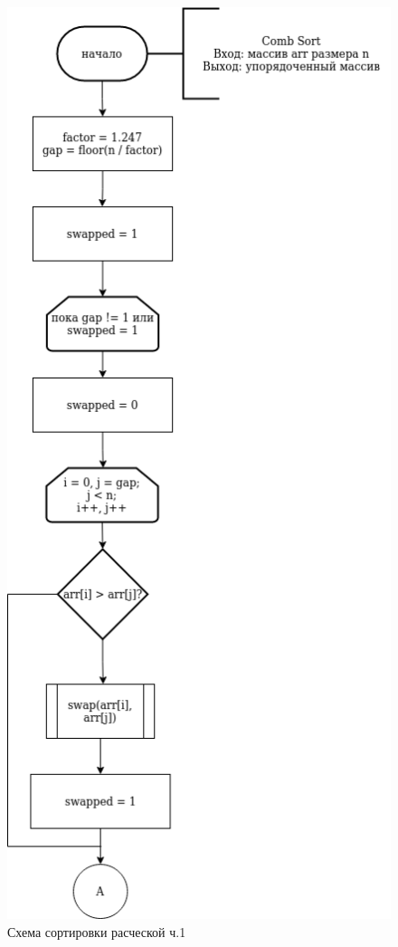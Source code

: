 \documentclass[12pt]{report}
\begin{document}
	\begin{figure}[h]
		\centering
		\includegraphics[width=0.5\linewidth]{combSort_1}
		\caption{Схема сортировки расческой ч.1}
		\label{fig:schema_selection}
	\end{figure}
	
\end{document}
